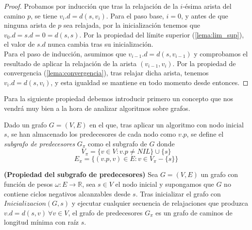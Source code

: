 \begin{proof}
	Probamos por inducción que tras la relajación de la $i$-ésima arista del camino $p$, se tiene $v_i.d=d(s,v_i)$. Para el paso base, $i=0$, y antes de que ninguna arista de $p$ sea relajada, por la inicialización tenemos que $v_0.d=s.d=0=d(s,s)$. Por la propiedad del límite superior (\autoref{lema:lim_sup}), el valor de $s.d$ nunca cambia tras su inicialización. \\
	Para el paso de inducción, asumimos que $v_{i-1}.d=d(s,v_{i-1})$ y comprobamos el resultado de aplicar la relajación de la arista $(v_{i-1},v_i)$. Por la propiedad de convergencia (\autoref{lema:convergencia}), tras relajar dicha arista, tenemos $v_i.d=d(s,v_i)$, y esta igualdad se mantiene en todo momento desde entonces.
\end{proof}

Para la siguiente propiedad debemos introducir primero un concepto que nos vendrá muy bien a la hora de analizar algoritmos sobre grafos.

\begin{definicion}
	Dado un grafo $G=(V,E)$ en el que, tras aplicar un algoritmo con nodo inicial $s$, se han almacenado los predecesores de cada nodo como $v.p$, se define el \textit{subgrafo de predecesores} $G_{\pi}$ como el subgrafo de $G$ donde
	$$V_{\pi}=\{v\in V : v.p \neq NIL\}\cup \{s\}$$
	$$E_{\pi}=\{(v.p,v)\in E : v\in V_{\pi}-\{s\}\}$$
\end{definicion}

\begin{proposicion}\label{prop:subg_pred}
	\textbf{(Propiedad del subgrafo de predecesores)} Sea $G=(V,E)$ un grafo con función de pesos $\omega : E\rightarrow \mathbb{R}$, sea $s\in V$ el nodo inicial y supongamos que $G$ no contiene ciclos negativos alcanzables desde $s$. Tras inicializar el grafo con $Inicializacion(G,s)$ y ejecutar cualquier secuencia de relajaciones que produzca $v.d=d(s,v)\ \forall v\in V$, el grafo de predecesores $G_{\pi}$ es un grafo de caminos de longitud mínima con raíz $s$.
\end{proposicion}

